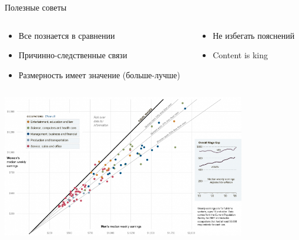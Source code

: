 \documentclass[10pt]{beamer}
\begin{document}
\begin{frame}{Полезные советы}

\begin{columns}[T]
    \begin{column}{.5\textwidth}    	
    	\begin{itemize}
		\item Все познается в сравнении
		\item Причинно-следственные связи
		\item Размерность имеет значение (больше-лучше)
		\end{itemize}	
    \end{column}
    \begin{column}{.5\textwidth}
    \begin{itemize}
		\item Не избегать пояснений
		\item Content is king
		\end{itemize}		
    \end{column}
  \end{columns}
  
  \begin{center}
   		\includegraphics[width=0.8\textwidth]{images/salaries.png}
    \end{center}

\end{frame}
\end{document}
